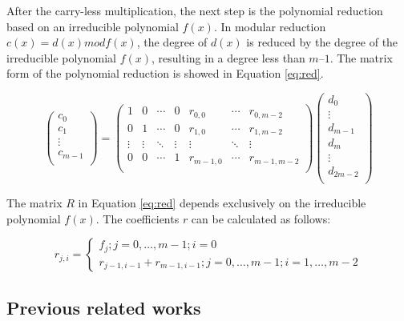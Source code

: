 After the carry-less multiplication, the next step is the polynomial reduction based on an 
irreducible polynomial $f(x)$. In modular reduction $c(x) = d(x) mod f(x)$, the degree of $d(x)$ is 
reduced by the degree of the irreducible polynomial $f(x)$, resulting in a degree less than $m – 1$.
The matrix form of the polynomial reduction is showed in Equation \ref{eq:red}.


\begin{equation}\label{eq:red}
    \begin{pmatrix}
        c_{0} \\
        c_{1} \\
        \vdots \\
        c_{m-1} \\
    \end{pmatrix}
    =
    \begin{pmatrix}
        1 & 0 & \cdots & 0 & r_{0,0} & \cdots & r_{0,m-2} \\
        0 & 1 & \cdots & 0 & r_{1,0} & \cdots & r_{1,m-2} \\
        \vdots & \vdots & \ddots & \vdots & \vdots & \ddots & \vdots \\
        0 & 0 & \cdots & 1 & r_{m-1,0} & \cdots & r_{m-1,m-2} \\
    \end{pmatrix}
    \begin{pmatrix}
        d_{0} \\
        \vdots \\
        d_{m-1} \\
        d_{m} \\
        \vdots \\
        d_{2m-2} \\
    \end{pmatrix}
\end{equation}

The matrix $R$ in Equation \ref{eq:red} depends exclusively on the irreducible polynomial $f(x)$. 
The coefficients $r$ can be calculated as follows:

\begin{equation}
    r_{j,i}
    =
    \left\{\begin{matrix}
    f_{j};j=0,\hdots,m-1; i=0 \\ 
    r_{j-1,i-1}+r_{m-1,i-1}; j=0,\hdots,m-1;i=1,\hdots,m-2
\end{matrix}\right.
    \label{eq:red2}
\end{equation}


\subsection{Previous related works}

